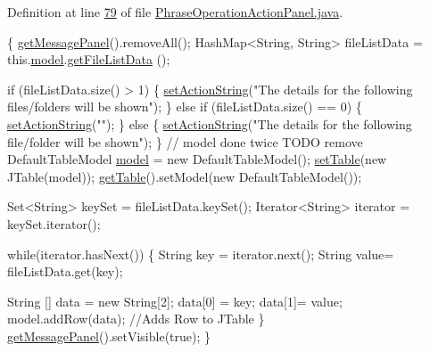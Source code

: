 Definition at line \hyperlink{L79}{79} of file \hyperlink{}{Phrase\-Operation\-Action\-Panel.\-java}.


\begin{DoxyCode}
                                  \{
        \hyperlink{classcom_1_1poly_1_1nlp_1_1filekommander_1_1views_1_1panels_1_1_abstract_message_panel_a2d8c613b03cb000425ae32a9a44dc805}{getMessagePanel}().removeAll();
        HashMap<String, String> fileListData = this.\hyperlink{classcom_1_1poly_1_1nlp_1_1filekommander_1_1views_1_1panels_1_1_phrase_operation_action_panel_ac8380b5cb091933bcb138d4b7471d3c1}{model}.\hyperlink{classcom_1_1poly_1_1nlp_1_1filekommander_1_1views_1_1models_1_1_phrase_operation_model_a80fd6066949ef4eabf1a4c0749afc364}{getFileListData}
      ();
        
        \textcolor{keywordflow}{if} (fileListData.size() > 1) \{
            \hyperlink{classcom_1_1poly_1_1nlp_1_1filekommander_1_1views_1_1panels_1_1_abstract_message_panel_a565a70e35ba8533880099438337eea08}{setActionString}(\textcolor{stringliteral}{"The details for the following
       files/folders will be shown"});
        \} \textcolor{keywordflow}{else} \textcolor{keywordflow}{if} (fileListData.size() == 0) \{
            \hyperlink{classcom_1_1poly_1_1nlp_1_1filekommander_1_1views_1_1panels_1_1_abstract_message_panel_a565a70e35ba8533880099438337eea08}{setActionString}(\textcolor{stringliteral}{""});
        \} \textcolor{keywordflow}{else} \{
            \hyperlink{classcom_1_1poly_1_1nlp_1_1filekommander_1_1views_1_1panels_1_1_abstract_message_panel_a565a70e35ba8533880099438337eea08}{setActionString}(\textcolor{stringliteral}{"The details for the following
       file/folder will be shown"});
        \}
        \textcolor{comment}{// model done twice TODO remove }
        DefaultTableModel \hyperlink{classcom_1_1poly_1_1nlp_1_1filekommander_1_1views_1_1panels_1_1_phrase_operation_action_panel_ac8380b5cb091933bcb138d4b7471d3c1}{model} = \textcolor{keyword}{new} DefaultTableModel();     
        \hyperlink{classcom_1_1poly_1_1nlp_1_1filekommander_1_1views_1_1panels_1_1_abstract_message_panel_ae66c31b95e8c1fe4d28565e7dcaf9a91}{setTable}(\textcolor{keyword}{new} JTable(model));     
        \hyperlink{classcom_1_1poly_1_1nlp_1_1filekommander_1_1views_1_1panels_1_1_abstract_message_panel_aab424ea4f0cf49aa1a619f21a996d6b5}{getTable}().setModel(\textcolor{keyword}{new} DefaultTableModel());    
        
        Set<String> keySet = fileListData.keySet();
        Iterator<String> iterator = keySet.iterator();
        
        \textcolor{keywordflow}{while}(iterator.hasNext())
        \{   
            String key = iterator.next();
            String value= fileListData.get(key);
            
            String [] data = \textcolor{keyword}{new} String[2];
            data[0] = key;
            data[1]= value;
            model.addRow(data); \textcolor{comment}{//Adds Row to JTable}
        \}
        \hyperlink{classcom_1_1poly_1_1nlp_1_1filekommander_1_1views_1_1panels_1_1_abstract_message_panel_a2d8c613b03cb000425ae32a9a44dc805}{getMessagePanel}().setVisible(\textcolor{keyword}{true});
    \}
\end{DoxyCode}
